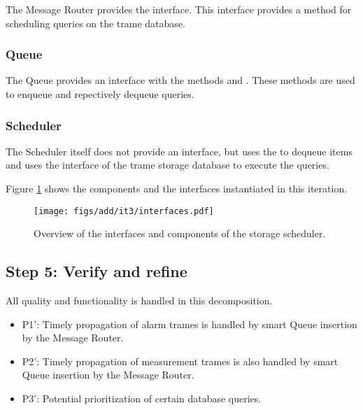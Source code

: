 \npar The Message Router provides the  interface.
This interface provides a method  for scheduling queries on
the trame database.

\subsubsection{Queue}

\npar The Queue provides an interface  with the
methods  and . These
methods are used to enqueue and repectively dequeue queries.

\subsubsection{Scheduler}

\npar The Scheduler itself does not provide an interface, but uses the
 to dequeue items and uses the interface of the trame storage
database to execute the queries.

\npar Figure \ref{fig:it3/interfaces} shows the components and the interfaces
instantiated in this iteration.

\begin{figure}[H]
	\begin{centering}
		\texttt{[image: figs/add/it3/interfaces.pdf]}
		\caption{Overview of the interfaces and components of the storage scheduler.}
		\label{fig:it3/interfaces}
	\end{centering}
\end{figure}

\subsection{Step 5: Verify and refine}
\label{add:it3/verification}

\npar All quality and functionality is handled in this decomposition.  

\begin{itemize}
	\item P1': Timely propagation of alarm trames is handled by smart Queue
	insertion by the Message Router. 
	\item P2': Timely propagation of measurement trames is also handled by smart
	Queue insertion by the Message Router. 
	\item P3': Potential prioritization of certain database queries. 
\end{itemize}
